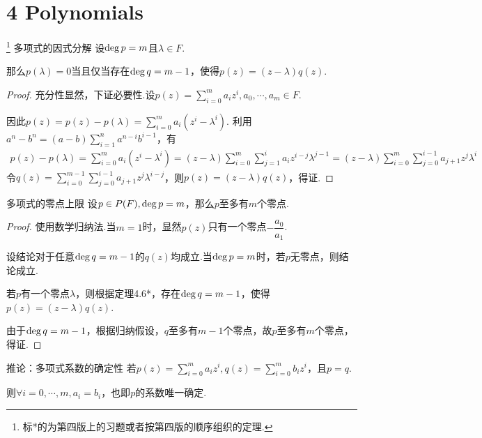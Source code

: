 \section{4 Polynomials}

\begin{theorem}[4.6*]\label{thm 4.6*} \footnote{\kaishu 标*的为第四版上的习题或者按第四版的顺序组织的定理.} 
    多项式的因式分解 \:
    设\(\operatorname{deg} p=m\)且\(\lambda \in F\).

    那么\(p(\lambda)=0\)当且仅当存在\(\operatorname{deg} q=m-1\)，使得\(p(z)=(z-\lambda)q(z)\).
\end{theorem}

\begin{proof}
    充分性显然，下证必要性.设\(p(z)=\sum_{i=0}^m a_iz^i,a_0,\cdots,a_m \in F\).

    因此\(p(z)=p(z)-p(\lambda)=\sum_{i=0}^m a_i(z^i-\lambda^i)\).
    利用\(a^n-b^n=(a-b)\sum_{i=1}^n a^{n-i}b^{i-1}\)，有
    \begin{align*}
        p(z)-p(\lambda)=\sum_{i=0}^m a_i(z^i-\lambda^i)
                        =(z-\lambda)\sum_{i=0}^m \sum_{j=1}^i a_iz^{i-j}\lambda^{j-1}
                        =(z-\lambda)\sum_{i=0}^m \sum_{j=0}^{i-1} a_{j+1}z^j\lambda^i
    \end{align*}
    令\(q(z)=\sum_{i=0}^{m-1} \sum_{j=0}^{i-1} a_{j+1}z^j\lambda^{i-j}\)，则\(p(z)=(z-\lambda)q(z)\)，得证.
\end{proof}

\begin{theorem}[4.8*]\label{thm 4.8*} 多项式的零点上限 \:
    设\(p \in P(F),\operatorname{deg} p=m\)，那么\(p\)至多有\(m\)个零点.
\end{theorem}

\begin{proof}
    使用数学归纳法.当\(m=1\)时，显然\(p(z)\)只有一个零点\(-\dfrac{a_0}{a_1}\).

    设结论对于任意\(\operatorname{deg} q=m-1\)的\(q(z)\)均成立.当\(\operatorname{deg} p=m\)时，若\(p\)无零点，则结论成立.
    
    若\(p\)有一个零点\(\lambda\)，则根据定理4.6*，存在\(\operatorname{deg} q=m-1\)，使得\(p(z)=(z-\lambda)q(z)\).
    
    由于\(\operatorname{deg} q=m-1\)，根据归纳假设，\(q\)至多有\(m-1\)个零点，故\(p\)至多有\(m\)个零点，得证.
\end{proof}

\begin{theorem}[4.8*]\label{col 4.8*} 推论：多项式系数的确定性 \:
    若\(p(z)=\sum_{i=0}^m a_iz^i,q(z)=\sum_{i=0}^m b_iz^i\)，且\(p=q\).

    则\(\forall i=0,\cdots,m,a_i=b_i\)，也即\(p\)的系数唯一确定.
\end{theorem}

